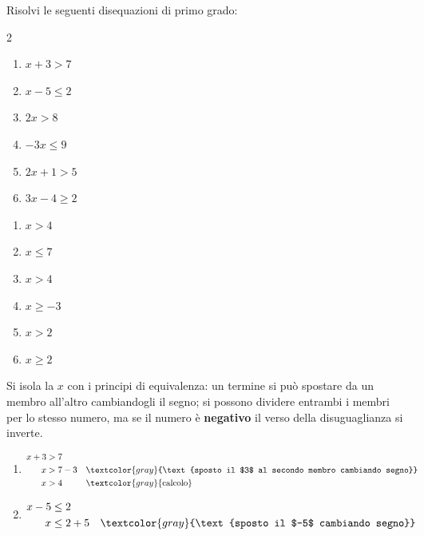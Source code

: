 
\begin{question}[ID=1.1, subtitle={Disequazioni di primo grado}, difficulty=facile, tags={disequazioni lineari}]
Risolvi le seguenti disequazioni di primo grado:
\begin{multicols}{2}
\begin{enumerate}[leftmargin=3.2cm]
    \item $x + 3 > 7$
    \item $x - 5 \leq 2$
    \item $2x > 8$
    \item $-3x \leq 9$
    \item $2x + 1 > 5$
    \item $3x - 4 \geq 2$
\end{enumerate}
\end{multicols}
\begin{solution}
\begin{enumerate}
    \item $x>4$
    \item $x\leq 7$
    \item $x>4$
    \item $x\geq -3$
    \item $x>2$
    \item $x\geq 2$
\end{enumerate}
\end{solution}
\begin{explanation}
Si isola la $x$ con i principi di equivalenza: un termine si può spostare da un membro all'altro cambiandogli il segno; si possono dividere entrambi i membri per lo stesso numero, ma se il numero è \textbf{negativo} il verso della disuguaglianza si inverte.
\begin{enumerate}
    \item \[\begin{aligned}
    x+3 &> 7\\
    x &> 7-3 && \textcolor{gray}{\text{sposto il $3$ al secondo membro cambiando segno}}\\
    x &> 4 && \textcolor{gray}{\text{calcolo}}
    \end{aligned}\]
    \item \[\begin{aligned}
    x-5 &\leq 2\\
    x &\leq 2+5 && \textcolor{gray}{\text{sposto il $-5$ cambiando segno}}\\

\end{aligned}\]
\end{enumerate}
\end{explanation}
\end{question}
